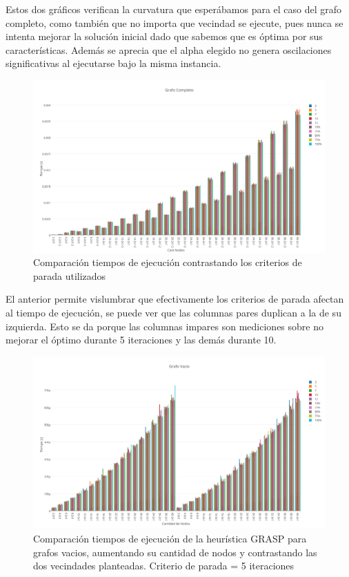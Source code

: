 Estos dos gr\'aficos verifican la curvatura que esper\'abamos para el caso del grafo completo, como tambi\'en que no importa que vecindad se ejecute, pues nunca se intenta mejorar la soluci\'on inicial dado que sabemos que es \'optima por sus caracter\'isticas. Adem\'as se aprecia que el alpha elegido no genera oscilaciones significativas al ejecutarse bajo la misma instancia.

  \begin{figure}[h!]
   \begin{center}
 	\includegraphics[scale=0.35]{imagenes/grasp/completo-5vs10.png}
 	\caption{Comparaci\'on tiempos de ejecuci\'on contrastando los criterios de parada utilizados}
   \end{center}
 \end{figure}

El anterior permite vislumbrar que efectivamente los criterios de parada afectan al tiempo de ejecuci\'on, se puede ver que las columnas pares duplican a la de su izquierda. Esto se da porque las columnas impares son mediciones sobre no mejorar el \'optimo durante 5 iteraciones y las dem\'as durante 10.

  \begin{figure}[h!]
   \begin{center}
 	\includegraphics[scale=0.35]{imagenes/grasp/vacio-5repes.png}
 	\caption{Comparaci\'on tiempos de ejecuci\'on de la heur\'istica GRASP para grafos vacios, aumentando su cantidad de nodos y contrastando las dos vecindades planteadas. Criterio de parada = 5 iteraciones}
   \end{center}
 \end{figure}


